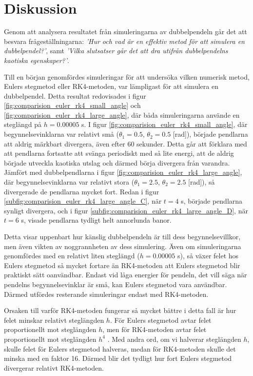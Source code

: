 \chapter{Diskussion}

Genom att analysera resultatet från simuleringarna av dubbelpendeln går det att besvara frågeställningarna: \emph{'Hur och vad är en effektiv metod för att simulera en dubbelpendel?'}, samt \emph{'Vilka slutsatser går det att dra utifrån dubbelpendelns kaotiska egenskaper?'}.  

Till en början genomfördes simuleringar för att undersöka vilken numerisk metod, Eulers stegmetod eller RK4-metoden, var lämpligast för att simulera en dubbelpendel. Detta resultat redovisades i figur \ref{fig:comparision_euler_rk4_small_angle} och \ref{fig:comparision_euler_rk4_large_angle}, där båda simuleringarna använde en steglängd på $h = 0.00005$ s. I figur \ref{fig:comparision_euler_rk4_small_angle}, där begynnelsevinklarna var relativt små ($\theta_1 = 0.5$, $\theta_2 = 0.5$ [rad]), började pendlarna att aldrig märkbart divergera, även efter 60 sekunder. 
Detta går att förklara med att pendlarna fortsatte att svänga periodiskt med så lite energi, att de aldrig började utveckla kaotiska utslag och därmed börja divergera från varandra. 
Jämfört med dubbelpendlarna i figur \ref{fig:comparision_euler_rk4_large_angle}, där begynnelsevinklarna var relativt stora ($\theta_1 = 2.5$, $\theta_2 = 2.5$ [rad]), så divergerade de pendlarna mycket fort. Redan i figur \ref{subfig:comparision_euler_rk4_large_angle_C}, när $t=4$ s, började pendlarna synligt divergera, och i figur \ref{subfig:comparision_euler_rk4_large_angle_D}, när $t=6$ s, visade pendlarna tydligt helt annorlunda banor. 

Detta visar uppenbart hur känslig dubbelpendeln är till dess begynnelsevillkor, men även vikten av noggrannheten av dess simulering. Även om simuleringarna genomfördes med en relativt liten steglängd ($h = 0.00005$ s), så växer felet hos Eulers stegmetod så mycket fortare än RK4-metoden  att Eulers stegmetod blir praktiskt sätt oanvändbar. Endast vid låga energier för pendeln, det vill säga när pendelns begynnelsevinklar är små, kan Eulers stegmetod vara användbar. Därmed utfördes resterande simuleringar endast med RK4-metoden.

Orsaken till varför RK4-metoden fungerar så mycket bättre i detta fall är hur felet minskar relativt steglängden $h$. För Eulers stegmetod avtar felet proportionellt mot steglängden $h$, men för RK4-metoden avtar felet proportionellt mot steglängden $h^4$ \cite{runge_kutta_methods_2026}. Med andra ord, om vi halverar steglängden $h$, skulle felet för Eulers stegmetod halveras, medan för RK4-metoden skulle det minska med en faktor 16. Därmed blir det tydligt hur fort Eulers stegmetod divergerar relativt RK4-metoden. 

